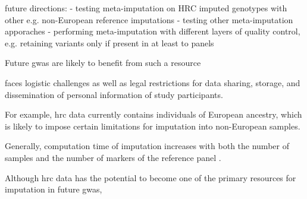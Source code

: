 future directions:
- testing meta-imputation on HRC imputed genotypes with other e.g. non-European reference imputations
- testing other meta-imputation apporaches
- performing meta-imputation with different layers of quality control, e.g. retaining variants only if present in at least to panels


Future gwas are likely to benefit from such a resource

faces logistic challenges as well as legal restrictions for data sharing, storage, and dissemination of personal information of study participants.

For example, \gls{hrc} data currently contains individuals of European ancestry,
which is likely to impose certain limitations for imputation into non-European samples.

Generally, computation time of imputation increases with both the number of samples and the number of markers of the reference panel \cite{Howie:2012ks}.

Although \gls{hrc} data has the potential to become one of the primary resources for imputation in future \gls{gwas},








